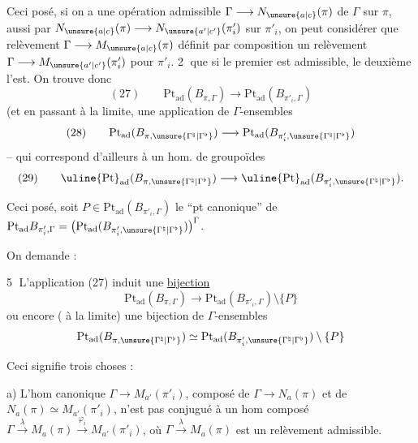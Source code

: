 Ceci posé, si on a une opération  admissible
$\Gamma\longrightarrow N_{\unsure{a|c}}(\pi)$ de $\Gamma$ sur $\pi$,
  aussi par
$N_{\unsure{a|c}}(\pi)\longrightarrow N_{\unsure{a'|c'}}(\pi'_i)$ sur $\pi'_i$,
on peut considérer que  relèvement
$\Gamma\longrightarrow M_{\unsure{a|c}}(\pi)$  définit
par composition un relèvement $\Gamma\longrightarrow M_{\unsure{a'|c'}}(\pi'_i)$
pour $\pi'_i$. 
\textcircled{2} que si le premier est admissible, le deuxième l'est.
On trouve donc
\[
(27)\qquad
\mathrm{Pt}_{\mathrm{ad}}(B_{\pi,\Gamma})
\longrightarrow
\mathrm{Pt}_{\mathrm{ad}}(B_{\pi'_i,\Gamma})
\]
(et en passant à la limite, une application de $\Gamma$-ensembles
\[
(28)\qquad
\mathrm{Pt}_{\mathrm{ad}}(B_{\pi,\unsure{\Gamma^{\natural}|\Gamma^{\flat}}})
\longrightarrow
\mathrm{Pt}_{\mathrm{ad}}(B_{\pi'_i,\unsure{\Gamma^{\natural}|\Gamma^{\flat}}})
\]
-- qui correspond d'ailleurs à un hom. de \unsure{$\Gamma$} groupoïdes
\[
(29)\qquad
\uline{\mathrm{Pt}}_{\mathrm{ad}}(B_{\pi,\unsure{\Gamma^{\natural}|\Gamma^{\flat}}})
\longrightarrow
\uline{\mathrm{Pt}}_{\mathrm{ad}}(B_{\pi'_i,\unsure{\Gamma^{\natural}|\Gamma^{\flat}}}).
\]

Ceci posé, soit $P\in\mathrm{Pt}_{\mathrm{ad}}(B_{\pi'_i,\Gamma})$
le ``pt canonique'' de
$\mathrm{Pt}_{\mathrm{ad}}B_{\pi'_i,\Gamma}
=\bigl(\mathrm{Pt}_{\mathrm{ad}}(B_{\pi'_i,\unsure{\Gamma^{\natural}|\Gamma^{\flat}}})\bigr)^\Gamma$.


On demande :

\textcircled{5} L'application (27) induit une \uline{bijection}
\[
\mathrm{Pt}_{\mathrm{ad}}(B_{\pi,\Gamma})
\longrightarrow
\mathrm{Pt}_{\mathrm{ad}}(B_{\pi'_i,\Gamma})\setminus\{P\}
\]
ou encore ( à la limite) une bijection de $\Gamma$-ensembles
\[
\mathrm{Pt}_{\mathrm{ad}}(B_{\pi,\unsure{\Gamma^{\natural}|\Gamma^{\flat}}})
\simeq
\mathrm{Pt}_{\mathrm{ad}}(B_{\pi'_i,\unsure{\Gamma^{\natural}|\Gamma^{\flat}}})\setminus\{P\}
\]

Ceci signifie trois choses :

a) L'hom canonique $\Gamma\longrightarrow M_{a'}(\pi'_i)$,
composé de $\Gamma\longrightarrow N_a(\pi)$ et de
$N_a(\pi)\simeq M_{a'}(\pi'_i)$,
n'est pas conjugué à un hom composé
$\Gamma\xrightarrow{\lambda}M_a(\pi)
\xrightarrow{\varphi_i}M_{a'}(\pi'_i)$,
où $\Gamma\xrightarrow{\lambda}M_a(\pi)$ est un relèvement admissible.

